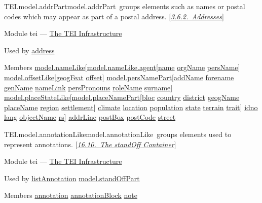 \begin{reflist}
\item[]\begin{specHead}{TEI.model.addrPart}{model.addrPart} groups elements such as names or postal codes which may appear as part of a postal address. [\textit{\hyperref[CONAAD]{3.6.2.\ Addresses}}]\end{specHead} 
    \item[{Module}]
  tei — \hyperref[ST]{The TEI Infrastructure}
    \item[{Used by}]
  \hyperref[TEI.address]{address}
    \item[{Members}]
  \hyperref[TEI.model.nameLike]{model.nameLike}[\hyperref[TEI.model.nameLike.agent]{model.nameLike.agent}[\hyperref[TEI.name]{name} \hyperref[TEI.orgName]{orgName} \hyperref[TEI.persName]{persName}] \hyperref[TEI.model.offsetLike]{model.offsetLike}[\hyperref[TEI.geogFeat]{geogFeat} \hyperref[TEI.offset]{offset}] \hyperref[TEI.model.persNamePart]{model.persNamePart}[\hyperref[TEI.addName]{addName} \hyperref[TEI.forename]{forename} \hyperref[TEI.genName]{genName} \hyperref[TEI.nameLink]{nameLink} \hyperref[TEI.persPronouns]{persPronouns} \hyperref[TEI.roleName]{roleName} \hyperref[TEI.surname]{surname}] \hyperref[TEI.model.placeStateLike]{model.placeStateLike}[\hyperref[TEI.model.placeNamePart]{model.placeNamePart}[\hyperref[TEI.bloc]{bloc} \hyperref[TEI.country]{country} \hyperref[TEI.district]{district} \hyperref[TEI.geogName]{geogName} \hyperref[TEI.placeName]{placeName} \hyperref[TEI.region]{region} \hyperref[TEI.settlement]{settlement}] \hyperref[TEI.climate]{climate} \hyperref[TEI.location]{location} \hyperref[TEI.population]{population} \hyperref[TEI.state]{state} \hyperref[TEI.terrain]{terrain} \hyperref[TEI.trait]{trait}] \hyperref[TEI.idno]{idno} \hyperref[TEI.lang]{lang} \hyperref[TEI.objectName]{objectName} \hyperref[TEI.rs]{rs}] \hyperref[TEI.addrLine]{addrLine} \hyperref[TEI.postBox]{postBox} \hyperref[TEI.postCode]{postCode} \hyperref[TEI.street]{street}
\end{reflist}  
\begin{reflist}
\item[]\begin{specHead}{TEI.model.annotationLike}{model.annotationLike} groups elements used to represent annotations. [\textit{\hyperref[SASOstdf]{16.10.\ The standOff Container}}]\end{specHead} 
    \item[{Module}]
  tei — \hyperref[ST]{The TEI Infrastructure}
    \item[{Used by}]
  \hyperref[TEI.listAnnotation]{listAnnotation} \hyperref[TEI.model.standOffPart]{model.standOffPart}
    \item[{Members}]
  \hyperref[TEI.annotation]{annotation} \hyperref[TEI.annotationBlock]{annotationBlock} \hyperref[TEI.note]{note}
\end{reflist}  
